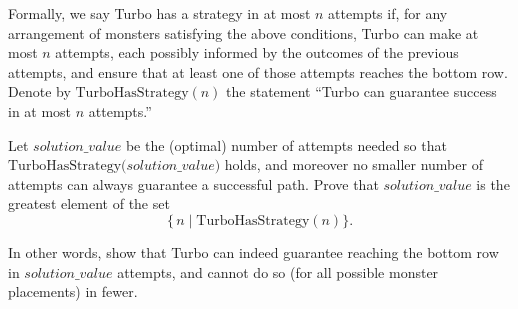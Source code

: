 \begin{tcolorbox}
Formally, we say Turbo has a strategy in at most \(n\) attempts if, for any arrangement of monsters satisfying the above conditions, Turbo can make at most \(n\) attempts, each possibly informed by the outcomes of the previous attempts, and ensure that at least one of those attempts reaches the bottom row. Denote by \(\mathrm{TurboHasStrategy}(n)\) the statement ``Turbo can guarantee success in at most \(n\) attempts.''

Let \(\textit{solution\_value}\) be the (optimal) number of attempts needed so that \(\mathrm{TurboHasStrategy}\bigl(\textit{solution\_value}\bigr)\) holds, and moreover no smaller number of attempts can always guarantee a successful path. Prove that \(\textit{solution\_value}\) is the greatest element of the set
\[
\{\,n \mid \mathrm{TurboHasStrategy}(n)\}.
\]

In other words, show that Turbo can indeed guarantee reaching the bottom row in \(\textit{solution\_value}\) attempts, and cannot do so (for all possible monster placements) in fewer.
\end{tcolorbox}

